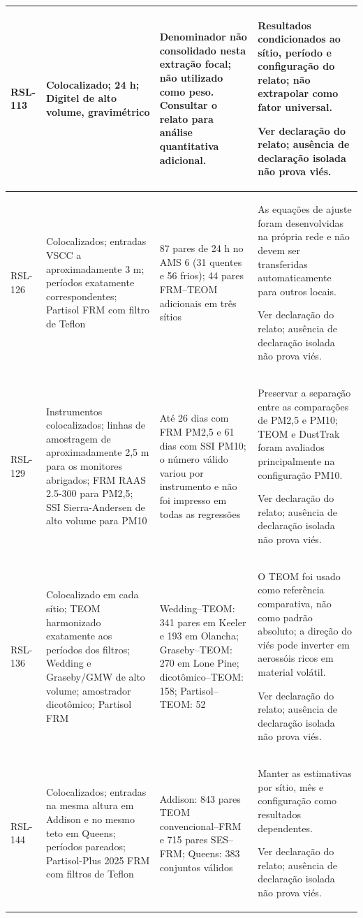 \begin{longtable}{|P{0.12\textwidth}|P{0.28\textwidth}|P{0.28\textwidth}|P{\arrayrulewidth\relax}|}
RSL-113 & Colocalizado; 24 h; Digitel de alto volume, gravimétrico & Denominador não consolidado nesta extração focal; não utilizado como peso. Consultar o relato para análise quantitativa adicional. & Resultados condicionados ao sítio, período e configuração do relato; não extrapolar como fator universal.\par\medskip Ver declaração do relato; ausência de declaração isolada não prova viés.\\\hline
RSL-126 & Colocalizados; entradas VSCC a aproximadamente 3 m; períodos exatamente correspondentes; Partisol FRM com filtro de Teflon & 87 pares de 24 h no AMS 6 (31 quentes e 56 frios); 44 pares FRM--TEOM adicionais em três sítios & As equações de ajuste foram desenvolvidas na própria rede e não devem ser transferidas automaticamente para outros locais.\par\medskip Ver declaração do relato; ausência de declaração isolada não prova viés.\\\hline
RSL-129 & Instrumentos colocalizados; linhas de amostragem de aproximadamente 2,5 m para os monitores abrigados; FRM RAAS 2.5-300 para PM2,5; SSI Sierra-Andersen de alto volume para PM10 & Até 26 dias com FRM PM2,5 e 61 dias com SSI PM10; o número válido variou por instrumento e não foi impresso em todas as regressões & Preservar a separação entre as comparações de PM2,5 e PM10; TEOM e DustTrak foram avaliados principalmente na configuração PM10.\par\medskip Ver declaração do relato; ausência de declaração isolada não prova viés.\\\hline
RSL-136 & Colocalizado em cada sítio; TEOM harmonizado exatamente aos períodos dos filtros; Wedding e Graseby/GMW de alto volume; amostrador dicotômico; Partisol FRM & Wedding--TEOM: 341 pares em Keeler e 193 em Olancha; Graseby--TEOM: 270 em Lone Pine; dicotômico--TEOM: 158; Partisol--TEOM: 52 & O TEOM foi usado como referência comparativa, não como padrão absoluto; a direção do viés pode inverter em aerossóis ricos em material volátil.\par\medskip Ver declaração do relato; ausência de declaração isolada não prova viés.\\\hline
RSL-144 & Colocalizados; entradas na mesma altura em Addison e no mesmo teto em Queens; períodos pareados; Partisol-Plus 2025 FRM com filtros de Teflon & Addison: 843 pares TEOM convencional--FRM e 715 pares SES--FRM; Queens: 383 conjuntos válidos & Manter as estimativas por sítio, mês e configuração como resultados dependentes.\par\medskip Ver declaração do relato; ausência de declaração isolada não prova viés.\\\hline

\end{longtable}
